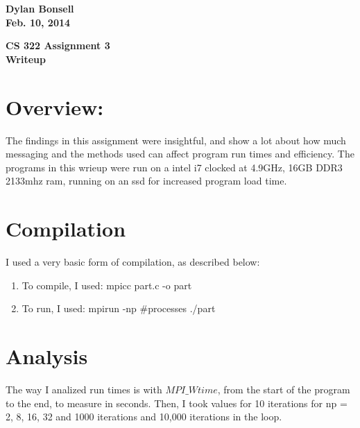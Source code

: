 \documentclass{article}%
\begin{document}
\begin{flushright}
\textbf{Dylan Bonsell \\
Feb. 10, 2014}
\end{flushright}

\begin{center}
\textbf{CS 322 Assignment 3 \\
Writeup} \\
\end{center}

\section*{Overview:}
The findings in this assignment were insightful, and show a lot about how much messaging and the methods used can affect program run times and efficiency.
The programs in this wrieup were run on a intel i7 clocked at 4.9GHz, 16GB DDR3 2133mhz ram, running on an ssd for increased program load time. 

\section*{Compilation}
I used a very basic form of compilation, as described below:
\begin{enumerate}
\item To compile, I used: mpicc part.c -o part
\item To run, I used: mpirun -np \#processes ./part
\end{enumerate}

\section*{Analysis}
The way I analized run times is with $MPI\_Wtime$, from the start of the program to the end, to measure in seconds. 
Then, I took values for 10 iterations for np = 2, 8, 16, 32 and 1000 iterations and 10,000 iterations in the loop.
\end{document}
